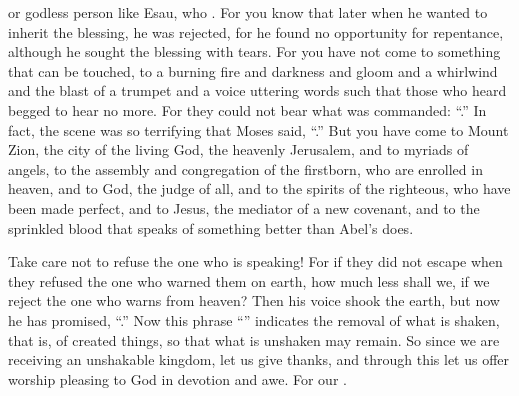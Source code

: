 {or
godless person
like
Esau,
who
{}.
For
you know
that
later
when
he wanted
to inherit
the blessing,
he was rejected,
for
he found
no
opportunity
for repentance,
although
he sought
the blessing
with
tears.
For
you have
not
come to
something that can be touched,
to a burning
fire
and
darkness
and
gloom
and
a whirlwind
and
the blast
of a trumpet
and
a voice
uttering words
such that those who heard
begged
to hear
no more.
For
they could
not
bear
what was commanded: “{}.”
In fact, the scene
was
so
terrifying
that Moses
said, “{}.”
But
you have come
to Mount
Zion,
the city
of the living
God,
the heavenly
Jerusalem,
and
to myriads
of angels, to the assembly
and
congregation
of the firstborn,
who are enrolled
in
heaven,
and
to God,
the judge
of all,
and
to the spirits
of the righteous,
who have been made perfect,
and
to Jesus,
the mediator
of a new
covenant,
and
to the sprinkled
blood
that speaks
of something better
than
Abel’s does.
\par }{\PP {}Take care
not
to refuse
the one who is speaking! For
if
they did
not
escape
when
they refused
the one who warned
them on
earth,
how much less
shall we,
if we reject
the one who warns from
heaven?
Then
his voice
shook
the earth,
but
now
he has promised, “{}.”
Now this phrase “{}”
indicates
the removal
of what is shaken,
that is,
of created things,
so that
what is unshaken
may remain.
So
since
we are receiving
an unshakable
kingdom,
let us give
thanks,
and through
this
let us offer worship
pleasing
to God
in
devotion
and
awe.
For
our
{}.

}
